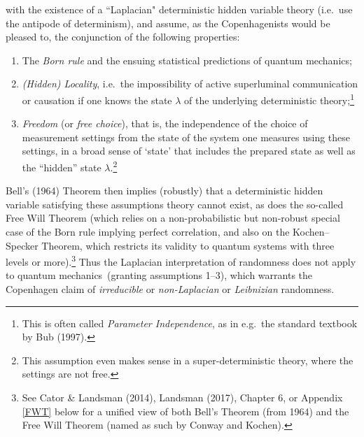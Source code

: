 \documentclass[11pt,a4paper]{article}
\numberwithin{equation}{section}
\newcommand{\qm}{quantum mechanics}
\newcommand{\lm}{\lambda} \newcommand{\Lm}{\Lambda}
\begin{document}
with the existence of a ``Laplacian" deterministic hidden variable theory (i.e.\ use the antipode of determinism),
and assume, as the Copenhagenists would be pleased to,  the conjunction of the following properties:
\begin{enumerate}
\item  The  \emph{Born rule} and the ensuing statistical predictions of \qm;
\item \emph{(Hidden) Locality}, i.e.\ the impossibility of active superluminal communication or causation if one knows the state $\lm$  of the underlying deterministic theory;\footnote{This is often called \emph{Parameter Independence}, as in e.g.\ the standard textbook by Bub (1997).}
\item  \emph{Freedom} (or \emph{free choice}), that is,  the independence of the choice of measurement settings from the state of the system one measures using these settings, in a broad sense of `state' that includes the prepared state as well as the ``hidden'' state $\lm$.\footnote{This assumption even makes sense in a super-deterministic theory, where the settings are not free.}
\end{enumerate}
Bell's (1964) Theorem then implies (robustly) that  a deterministic hidden variable satisfying these assumptions theory cannot exist, as does the so-called Free Will Theorem (which relies on a non-probabilistic but non-robust special case of the Born rule implying perfect correlation, and also  on the Kochen--Specker Theorem, which restricts its validity to quantum systems with three levels or more).\footnote{See Cator \& Landsman (2014), Landsman (2017), Chapter 6, or Appendix \ref{FWT} below for a unified view of both Bell's Theorem  (from 1964)  and the Free Will Theorem (named as such by Conway and Kochen).
} Thus the Laplacian interpretation of randomness does not apply to \qm\ 
(granting assumptions 1--3), which warrants the Copenhagen claim of \emph{irreducible} or \emph{non-Laplacian} or \emph{Leibnizian} randomness.
  
\end{document}
